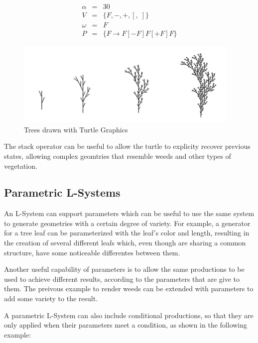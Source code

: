 \documentclass{acmtog}
\begin{document}
\begin{eqnarray*}
  \alpha  &=& 30                         \\
  V       &=& \{F, -, +, [,\; ]\}        \\
  \omega  &=& F                           \\
  P       &=& \{F \rightarrow F[-F]F[+F]F\} 
\end{eqnarray*}

\begin{figure}[!htp]
  \begin{center}
    \includegraphics[width=\columnwidth]{images/3_tree}
    \caption{Trees drawn with Turtle Graphics \label{fig:tree}}
    \end{center}
\end{figure}

The stack operator can be useful to allow the turtle to explicity recover previous states, allowing complex geomtries that resemble weeds and other types of vegetation.

\subsection{Parametric L-Systems}
\label{subsec:parametric}

An L-System can support parameters which can be useful to use the same system to generate geometries with a certain degree of variety. For example, a generator for a tree leaf can be parameterized with the leaf's color and length, resulting in the creation of several different leafs which, even though are sharing a common structure, have some noticeable differentes between them.

Another useful capability of parameters is to allow the same productions to be used to achieve different results, according to the parameters that are give to them. The preivous example to render weeds can be extended with parameters to add some variety to the result.

A parametric L-System can also include conditional productions, so that they are only applied when their parameters meet a condition, as shown in the following example:
\end{document}
